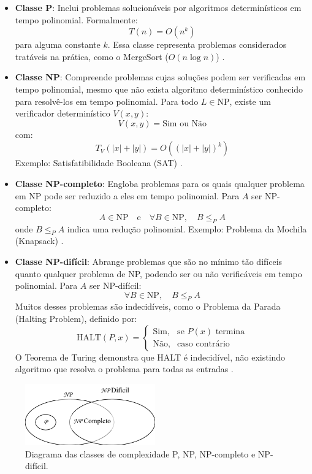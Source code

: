 \documentclass[12pt, a4paper]{article}
\begin{document}
\begin{itemize}
    \item \textbf{Classe P}: Inclui problemas solucionáveis por algoritmos determinísticos em tempo polinomial. Formalmente:
    \[
    T(n) = O(n^k)
    \]
    para alguma constante \( k \). Essa classe representa problemas considerados tratáveis na prática, como o MergeSort (\( O(n \log n) \)) .

    \item \textbf{Classe NP}: Compreende problemas cujas soluções podem ser verificadas em tempo polinomial, mesmo que não exista algoritmo determinístico conhecido para resolvê-los em tempo polinomial. Para todo \( L \in \text{NP} \), existe um verificador determinístico \( V(x,y) \):
    \[
    V(x, y) = \text{Sim ou Não}
    \]
    com:
    \[
    T_V(|x| + |y|) = O((|x| + |y|)^k)
    \]
    Exemplo: Satisfatibilidade Booleana (SAT) .

    \item \textbf{Classe NP-completo}: Engloba problemas para os quais qualquer problema em NP pode ser reduzido a eles em tempo polinomial. Para \( A \) ser NP-completo:
    \[
    A \in \text{NP} \quad \text{e} \quad \forall B \in \text{NP}, \quad B \leq_P A
    \]
    onde \( B \leq_P A \) indica uma redução polinomial. Exemplo: Problema da Mochila (Knapsack) .

    \item \textbf{Classe NP-difícil}: Abrange problemas que são no mínimo tão difíceis quanto qualquer problema de NP, podendo ser ou não verificáveis em tempo polinomial. Para \( A \) ser NP-difícil:
    \[
    \forall B \in \text{NP}, \quad B \leq_P A
    \]
    Muitos desses problemas são indecidíveis, como o Problema da Parada (Halting Problem), definido por:
    \[
    \text{HALT}(P,x) = 
    \begin{cases}
    \text{Sim}, & \text{se } P(x) \text{ termina} \\
    \text{Não}, & \text{caso contrário}
    \end{cases}
    \]
    O Teorema de Turing demonstra que HALT é indecidível, não existindo algoritmo que resolva o problema para todas as entradas .
\end{itemize}

\begin{figure}[H]
    \centering
    \includegraphics[width=0.5\textwidth]{img/relacaoDeConjuntos.png}
    \caption{Diagrama das classes de complexidade P, NP, NP-completo e NP-difícil.}
    \label{fig:complexidade}
\end{figure}
\end{document}
